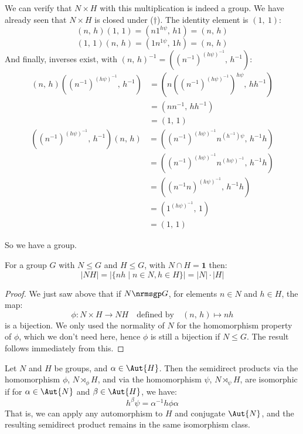 We can verify that \(N {\times} H\) with this multiplication is indeed a group.
We have already seen that \(N {\times} H\) is closed under (\(\dagger\)).
The identity element is \((1,\ 1)\):
\[ (n,\, h)(1,\, 1) =  (n 1^{h\psi},\, h 1) = (n,\, h)\]
\[ (1,\, 1)(n,\, h) =  (1 n^{1\psi},\, 1 h) = (n,\, h)\]
And finally, inverses exist, with \({(n,\, h)}^{-1} = \left({(n^{-1})}^{{(h\psi)}^{-1}},\, h^{-1}\right)\):
\begin{align*}
    (n,\, h)\left({(n^{-1})}^{{(h\psi)}^{-1}},\, h^{-1}\right)
    &= \left(n {\left({(n^{-1})}^{{(h\psi)}^{-1}}\right)}^{h\psi},\, hh^{-1} \right) \\
    &= (n n^{-1},\, h h^{-1}) \\
    &= (1,\, 1)
\end{align*}
\begin{align*}
    \left({(n^{-1})}^{{(h\psi)}^{-1}},\, h^{-1}\right)(n,\, h)
    &= \left({(n^{-1})}^{{(h\psi)}^{-1}} n^{(h^{-1})\psi},\, h^{-1} h \right) \\
    &= \left({(n^{-1})}^{{(h\psi)}^{-1}} n^{{(h\psi)}^{-1}},\, h^{-1} h \right) \\
    &= \left({(n^{-1} n)}^{{(h\psi)}^{-1}},\, h^{-1} h \right)  \\
    &= \left(1^{{(h\psi)}^{-1}},\, 1 \right) \\
    &= (1,\, 1)
\end{align*}

So we have a group.

\begin{lemma}\label{lem:setprodorder}
    \raggedright
    For a group \(G\) with \(N \leqslant G\) and \(H \leqslant G\), with \(N \cap H = \bm{1}\) then:
    \[|NH| = |\{nh \mid n \in N, h \in H\}| = |N| \cdot |H|\]
\end{lemma}

\begin{proof}
    We just saw above that if \(N \nrmsgp G\), for elements \(n \in N\) and \(h \in H\), the map:
    \[\phi:N \times H \to NH \quad \text{defined by} \quad (n,\,h) \mapsto nh\]
    is a bijection.
    We only used the normality of \(N\) for the homomorphism property of \(\phi\), which we don't need here, hence
    \(\phi\) is still a bijection if \(N \leqslant G\).
    The result follows immediately from this.
\end{proof}

\begin{lemma}\label{lem:semiisom}
    \raggedright
    Let \(N\) and \(H\) be groups, and \(\alpha \in \Aut{H}\).
    Then the semidirect products via the homomorphism \(\phi\), \(N \rtimes_\phi H\), and via the homomorphism
    \(\psi\), \(N \rtimes_\psi H\), are isomorphic if for \(\alpha \in \Aut{N}\) and \(\beta \in \Aut{H}\), we have:
    \[h^\beta\psi = \alpha^{-1}h\phi\alpha \tag{for all \(h \in H\)}\]
    That is, we can apply any automorphism to \(H\) and conjugate \(\Aut{N}\), and the resulting semidirect product remains in
    the same isomorphism class.
\end{lemma}

